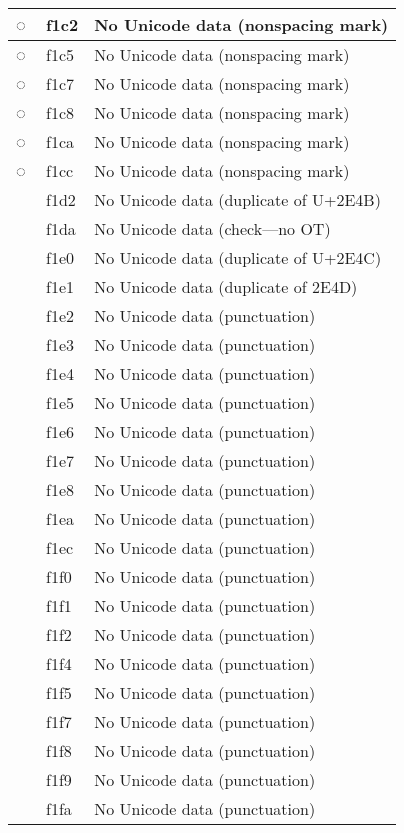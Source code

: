 \documentclass[12pt,letterpaper,openany]{book}
\begin{document}
\begin{center}
\begin{supertabular}{|m{0.25in}|m{0.5in}|m{4in}|}
			◌ & f1c2 & No Unicode data (nonspacing mark)\\\hline
			◌ & f1c5 & No Unicode data (nonspacing mark)\\\hline
			◌ & f1c7 & No Unicode data (nonspacing mark)\\\hline
			◌ & f1c8 & No Unicode data (nonspacing mark)\\\hline
			◌ & f1ca & No Unicode data (nonspacing mark)\\\hline
			◌ & f1cc & No Unicode data (nonspacing mark)\\\hline
			 & f1d2 & No Unicode data (duplicate of U+2E4B)\\\hline
			 & f1da & No Unicode data (check---no OT)\\\hline
			 & f1e0 & No Unicode data (duplicate of U+2E4C)\\\hline
			 & f1e1 & No Unicode data (duplicate of 2E4D)\\\hline
			 & f1e2 & No Unicode data (punctuation)\\\hline
			 & f1e3 & No Unicode data (punctuation)\\\hline
			 & f1e4 & No Unicode data (punctuation)\\\hline
			 & f1e5 & No Unicode data (punctuation)\\\hline
			 & f1e6 & No Unicode data (punctuation)\\\hline
			 & f1e7 & No Unicode data (punctuation)\\\hline
			 & f1e8 & No Unicode data (punctuation)\\\hline
			 & f1ea & No Unicode data (punctuation)\\\hline
			 & f1ec & No Unicode data (punctuation)\\\hline
			 & f1f0 & No Unicode data (punctuation)\\\hline
			 & f1f1 & No Unicode data (punctuation)\\\hline
			 & f1f2 & No Unicode data (punctuation)\\\hline
			 & f1f4 & No Unicode data (punctuation)\\\hline
			 & f1f5 & No Unicode data (punctuation)\\\hline
			 & f1f7 & No Unicode data (punctuation)\\\hline
			 & f1f8 & No Unicode data (punctuation)\\\hline
			 & f1f9 & No Unicode data (punctuation)\\\hline
			 & f1fa & No Unicode data (punctuation)\\\hline

\end{supertabular}
\end{center}
\end{document}
